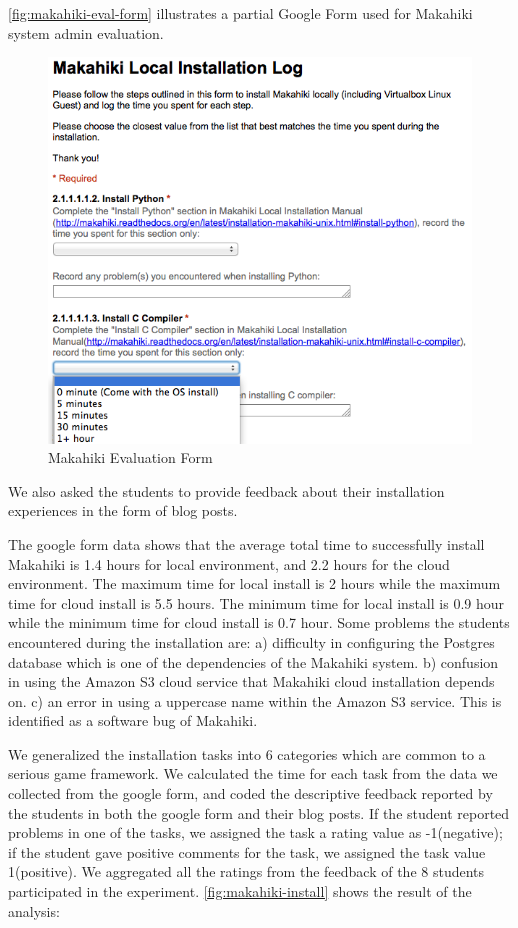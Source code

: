 \documentclass{sigchi}
\begin{document}
\autoref{fig:makahiki-eval-form} illustrates a partial Google Form
used for Makahiki system admin evaluation.

\begin{figure}[ht!]
   \centering
   \includegraphics[width=\columnwidth]{installation-eval-form}
   \caption{Makahiki Evaluation Form}
   \label{fig:makahiki-eval-form}
\end{figure}

We also asked the students to provide feedback about their installation experiences
in the form of blog posts.

The google form data shows that the average total time to successfully install Makahiki
is 1.4 hours for local environment, and 2.2 hours for the cloud environment. The maximum time for local install is 2 hours while the maximum time for cloud install is 5.5 hours. The minimum time for local install is 0.9 hour while the minimum time for cloud install is 0.7 hour. Some problems the students encountered during the installation are:
a) difficulty in configuring the Postgres database which is one of the dependencies of
the Makahiki system. b) confusion in using the Amazon S3 cloud service that Makahiki cloud
installation depends on. c) an error in using a  uppercase name within the Amazon S3 service.
This is identified as a software bug of Makahiki.


We generalized the installation tasks into 6 categories which are common to a serious game
framework. We calculated the time for each task from the data we collected from the google
form, and coded the descriptive feedback reported by the students in both the google form and
 their blog posts. If the student reported problems in one of the tasks, we assigned the task
  a rating value as -1(negative); if the student gave positive comments for the task, we
  assigned the task value 1(positive). We aggregated all the ratings from the feedback of
  the 8 students participated in the experiment. \autoref{fig:makahiki-install} shows the result of the analysis:
\end{document}
